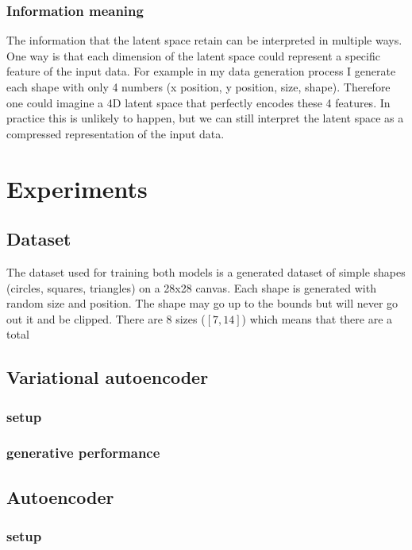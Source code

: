 \documentclass[conference,a4paper]{IEEEtran}
\begin{document}
\subsubsection{Information meaning}

The information that the latent space retain can be interpreted in multiple ways. One way is that each dimension of the latent space could represent a specific feature of the input data. For example in my data generation process I generate each shape with only 4 numbers (x position, y position, size, shape). Therefore one could imagine a 4D latent space that perfectly encodes these 4 features. In practice this is unlikely to happen, but we can still interpret the latent space as a compressed representation of the input data.

\section{Experiments}

\subsection{Dataset}

The dataset used for training both models is a generated dataset of simple shapes (circles, squares, triangles) on a 28x28 canvas. Each shape is generated with random size and position. The shape may go up to the bounds but will never go out it and be clipped. There are 8 sizes ($[7,14]$) which means that there are a total 

\subsection{Variational autoencoder}

\subsubsection{setup}

\subsubsection{generative performance}

\subsection{Autoencoder}

\subsubsection{setup}
\end{document}
